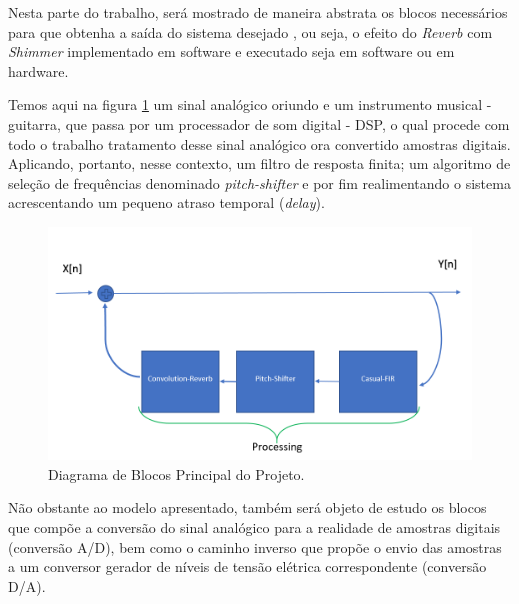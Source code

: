 	Nesta parte do trabalho, será mostrado de maneira abstrata os blocos necessários para que obtenha a saída do sistema desejado , ou seja, o efeito do \textit{Reverb} com \textit{Shimmer} implementado em software e executado seja em software ou em hardware.
		
	Temos aqui na figura \ref{bloco-principal} um sinal analógico oriundo e um instrumento musical - guitarra, que passa por um processador de som digital - DSP, o qual procede com todo o trabalho tratamento desse sinal analógico ora convertido amostras digitais. Aplicando, portanto, nesse contexto, um filtro de resposta finita; um algoritmo de seleção de frequências denominado \textit{pitch-shifter} e por fim realimentando o sistema acrescentando um pequeno atraso temporal (\textit{delay}).
	
	\begin{figure}[!h t b]
		\centering
		\includegraphics[scale=0.5]{./figuras/diagrama_bloco_principal.PNG}
		\caption{Diagrama de Blocos Principal do Projeto.}
		\label{bloco-principal}
	\end{figure}
	

	Não obstante ao modelo apresentado, também será objeto de estudo os blocos que compõe a conversão do sinal analógico para a realidade de amostras digitais (conversão A/D), bem como o caminho inverso que propõe o envio das amostras a um conversor gerador de níveis de tensão elétrica correspondente (conversão D/A).
	
	
	
	
	

